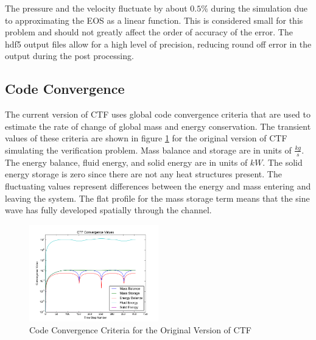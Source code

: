 \documentclass{mc2015}
\begin{document}
 The pressure and the velocity fluctuate by about $0.5\%$ during the simulation
 due to approximating the EOS as a linear function. This is considered small for
 this problem and should not greatly affect the order of accuracy of the error. 
 The hdf5 output files allow for a high level of precision, reducing
 round off error in the output during the post processing.

\subsection{Code Convergence}

The current version of CTF uses global code convergence criteria that are
used to estimate the rate of change of global mass and energy conservation. The
transient values of these criteria are shown in figure \ref{fig:Code_Convergence:Original} for the original version of
CTF simulating the verification problem. Mass balance and storage are in units
of $\frac{kg}{s}$. The energy balance, fluid energy, and solid energy are in units of $kW$.
The solid energy storage is zero since there are not any heat structures present. The fluctuating values
represent differences between the energy and mass entering and leaving the
system. The flat profile for the mass storage term means that the sine wave has
fully developed spatially through the channel. 

\begin{figure}[!h]
	\centering
	\includegraphics[width=0.50\textwidth]{images/Code_Verification/run_00_00/original/results/Convergence_Plot}
	\caption{Code Convergence Criteria for the Original Version of CTF}
	\label{fig:Code_Convergence:Original}
\end{figure}
\end{document}
